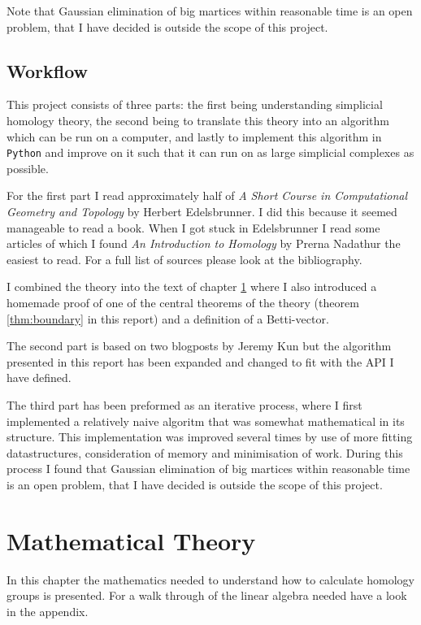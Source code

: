 \documentclass[11pt,a4paper,twoside]{report}
\begin{document}
Note that Gaussian elimination of big martices within reasonable time is an open problem, that I have decided is outside the scope of this project.
\newpage
\section*{Workflow}
This project consists of three parts: the first being understanding simplicial homology theory, the second being to translate this theory into an algorithm which can be run on a computer, and lastly to implement this algorithm in \texttt{Python} and improve on it such that it can run on as large simplicial complexes as possible.

For the first part I read approximately half of \emph{A Short Course in Computational Geometry and Topology} by Herbert Edelsbrunner\cite{Edelsbrunner}. I did this because it seemed manageable to read a book. When I got stuck in Edelsbrunner I read some articles of which I found \emph{An Introduction to Homology} by Prerna Nadathur \cite{Nadathur} the easiest to read. For a full list of sources please look at the bibliography.

I combined the theory into the text of chapter \ref{ch:theory} where I also introduced a homemade proof of one of the central theorems of the theory (theorem \ref{thm:boundary} in this report) and a definition of a Betti-vector.

The second part is based on two blogposts by Jeremy Kun \cite{KunPrimer}\cite{Kun} but the algorithm presented in this report has been expanded and changed to fit with the API I have defined.

The third part has been preformed as an iterative process, where I first implemented a relatively naive algoritm that was somewhat mathematical in its structure. This implementation was improved several times by use of more fitting datastructures, consideration of memory and minimisation of work. During this process I found that Gaussian elimination of big martices within reasonable time is an open problem, that I have decided is outside the scope of this project.

\chapter{Mathematical Theory} \label{ch:theory}
In this chapter the mathematics needed to understand how to calculate homology groups is presented. For a walk through of the linear algebra needed have a look in the appendix.
\end{document}

